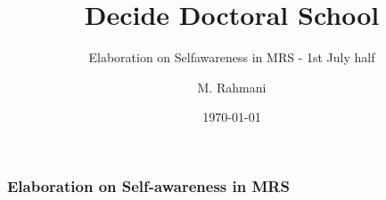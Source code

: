 \documentclass{beamer}
\title{Decide Doctoral School}
\subtitle{Elaboration on Selfawareness in MRS - 1st July half}
\author{M. Rahmani}
\institute{University of Klagenfurt}
\date{\today}
\begin{document}
	\begin{frame}
		\titlepage
	\end{frame}
	\begin{frame}
		\frametitle{Elaboration on Self-awareness in MRS}			
	\end{frame}
\end{document}
